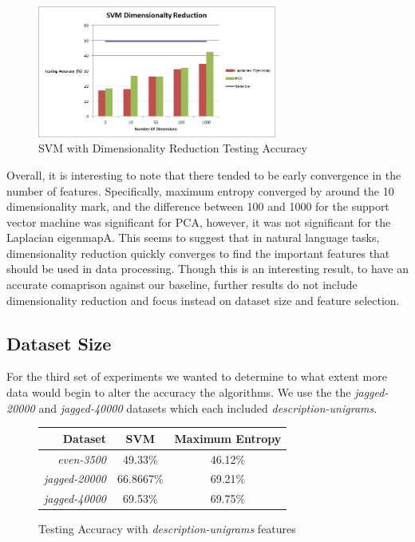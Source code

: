 \begin{figure}[!h]
\begin{center}
\caption{SVM with Dimensionality Reduction Testing Accuracy}
\includegraphics[width=0.7\textwidth]{SVM_Dimensionality_Reduction.png}
\end{center}
\end{figure}

Overall, it is interesting to note that there tended to be early convergence in the number of features.  Specifically, maximum entropy converged by around the 10 dimensionality mark, and the difference between 100 and 1000 for the support vector machine was significant for PCA, however, it was not significant for the Laplacian eigenmapA.  This seems to suggest that in natural language tasks, dimensionality reduction quickly converges to find the important features that should be used in data processing.  Though this is an interesting result, to have an accurate comaprison against our baseline, further results do not include dimensionality reduction and focus instead on dataset size and feature selection.

\subsection{Dataset Size}
For the third set of experiments we wanted to determine to what extent more data would begin to alter the accuracy the algorithms.  We use the the \emph{jagged-20000} and \emph{jagged-40000} datasets which each included \emph{description-unigrams}.

\begin{figure}[!h]
\begin{center}
\caption{Testing Accuracy with \emph{description-unigrams} features}
\begin{tabular}{| r | c | c |}
\hline
\textbf{Dataset} & \textbf{SVM} & \textbf{Maximum Entropy} \\ \hline
\emph{even-3500} & 49.33\% & 46.12\% \\ \hline
\emph{jagged-20000} & 66.8667\% & 69.21\% \\ \hline
\emph{jagged-40000} & 69.53\% & 69.75\% \\ \hline
\end{tabular}
\end{center}
\end{figure}

